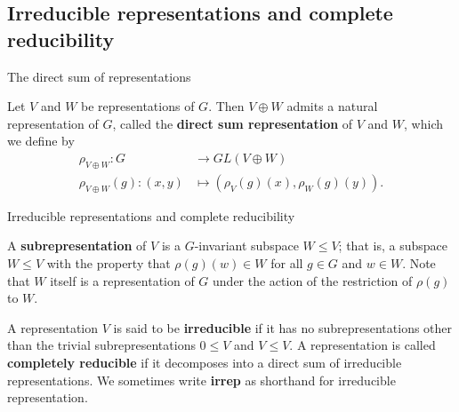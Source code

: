 \subsection{Irreducible representations and complete reducibility}
\begin{frame}{The direct sum of representations}
\begin{definition}
Let $V$ and $W$ be representations of $G$.  Then $V \oplus W$ admits a  natural representation of $G$, called the \textbf{direct sum representation} of $V$ and $W$, which we define by 
\begin{align*}
\rho_{V \oplus W} \colon G &\to GL(V \oplus W) \\
\rho_{V \oplus W}(g) \colon (x,y) &\mapsto (\rho_{V} (g)(x), \rho_{W}(g)(y)).
\end{align*}
\end{definition}
\end{frame}

\begin{frame}{Irreducible representations and complete reducibility}
\begin{definition} A \textbf{subrepresentation} of $V$ is a $G$-invariant subspace $W \leq V$; that is, a subspace $W \leq V$ with the property that $\rho(g) (w) \in W$ for all $g \in G$ and $w \in W$.  Note that $W$ itself is a representation of $G$ under the action of the restriction of $\rho(g)$ to $W$.
\end{definition}
\begin{definition}
A representation $V$ is said to be \textbf{irreducible} if it has no subrepresentations other than the trivial subrepresentations $ 0 \leq V$ and $V \leq V$.  A representation is called \textbf{completely reducible} if it decomposes into a direct sum of irreducible representations.  We sometimes write \textbf{irrep} as shorthand for irreducible representation.
\end{definition}
\end{frame}


